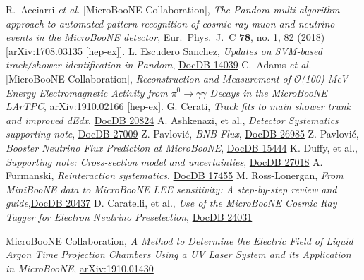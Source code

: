 \documentclass[a4paper]{article}
\begin{document}
\begin{thebibliography}{}
  R.~Acciarri {\it et al.} [MicroBooNE Collaboration],
  \emph{The Pandora multi-algorithm approach to automated pattern recognition of cosmic-ray muon and neutrino events in the MicroBooNE detector}, Eur.\ Phys.\ J.\ C {\bf 78}, no. 1, 82 (2018) [arXiv:1708.03135 [hep-ex]].
L. Escudero Sanchez, \emph{Updates on SVM-based track/shower identification in Pandora},
\href{https://microboone-docdb.fnal.gov/cgi-bin/private/ShowDocument?docid=14039}{DocDB 14039}
  C.~Adams {\it et al.} [MicroBooNE Collaboration],
  \emph{Reconstruction and Measurement of $\mathcal{O}$(100) MeV Energy Electromagnetic Activity from $\pi^0 \rightarrow \gamma\gamma$ Decays in the MicroBooNE LArTPC},  arXiv:1910.02166 [hep-ex].
G. Cerati, \emph{Track fits to main shower trunk and improved dEdx}, \href{https://microboone-docdb.fnal.gov/cgi-bin/private/ShowDocument?docid=20824}{DocDB 20824}
A. Ashkenazi, et al., \emph{Detector Systematics supporting note}, \href{https://microboone-docdb.fnal.gov/cgi-bin/private/ShowDocument?docid=27009}{DocDB 27009}
Z. Pavlović, \emph{BNB Flux}, \href{https://microboone-docdb.fnal.gov/cgi-bin/private/RetrieveFile?docid=26985}{DocDB 26985}
Z. Pavlović, \emph{Booster Neutrino Flux Prediction at MicroBooNE}, \href{https://microboone-docdb.fnal.gov/cgi-bin/private/RetrieveFile?docid=15444}{DocDB 15444}
K. Duffy, et al., \emph{Supporting note: Cross-section model and uncertainties}, \href{https://microboone-docdb.fnal.gov/cgi-bin/private/ShowDocument?docid=27018}{DocDB 27018}
A. Furmanski, \emph{Reinteraction systematics}, \href{https://microboone-docdb.fnal.gov/cgi-bin/private/ShowDocument?docid=17455}{DocDB 17455}
M. Ross-Lonergan, \emph{From MiniBooNE data to MicroBooNE LEE sensitivity: A step-by-step review and guide},\href{https://microboone-docdb.fnal.gov/cgi-bin/private/RetrieveFile?docid=20437}{DocDB 20437}
D. Caratelli, et al., \emph{Use of the MicroBooNE Cosmic Ray Tagger for Electron Neutrino Preselection}, \href{https://microboone-docdb.fnal.gov/cgi-bin/private/RetrieveFile?docid=24031&filename=CRTPACTechnote.pdf&version=1}{DocDB 24031}

MicroBooNE Collaboration, \emph{A Method to Determine the Electric Field of Liquid Argon Time Projection Chambers Using a UV Laser System and its Application in MicroBooNE}, \href{https://arxiv.org/abs/1910.01430}{arXiv:1910.01430}

\end{thebibliography}
\end{document}
